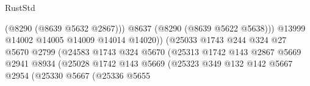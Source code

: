 \begin{lexlean}{RustStd}
\begin{coremodule}
                                                          (@8290 (@8639 @5632 @2867)))
                                                        @8637
                                                        (@8290 (@8639 @5622 @5638)))
                                                      @13999
                                                      @14002
                                                      @14005
                                                      @14009
                                                      @14014
                                                      @14020))
                                                  (@25033
                                                    @1743
                                                    @244
                                                    @324
                                                    @27
                                                    @5670
                                                    @2799
                                                    (@24583
                                                      @1743
                                                      @324
                                                      @5670
                                                      (@25313
                                                        @1742
                                                        @143
                                                        @2867
                                                        @5669
                                                        @2941
                                                        @8934
                                                        (@25028
                                                          @1742
                                                          @143
                                                          @5669
                                                          (@25323
                                                            @349
                                                            @132
                                                            @142
                                                            @5667
                                                            @2954
                                                            (@25330
                                                              @5667
                                                              (@25336
                                                                @5655

\end{coremodule}
\end{lexlean}
